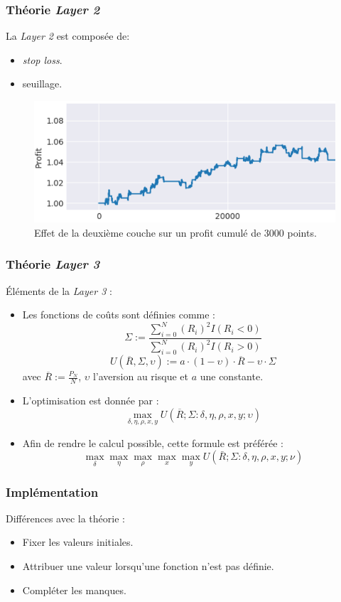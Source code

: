 \documentclass{beamer}
\begin{document}
	\begin{frame}
		\frametitle{Théorie \textit{Layer 2}}
		La \textit{Layer 2} est composée de:
		\begin{itemize}
			\item \textit{stop loss}.
			\item seuillage.
		\end{itemize}
		\begin{figure}
			\includegraphics[scale=0.4]{../Rapport/images/stop_loss}
			\caption{Effet de la deuxième couche sur un profit cumulé de 3000 points.}
		\end{figure}
	\end{frame}

	\begin{frame}
		\frametitle{Théorie \textit{Layer 3}}
		Éléments de la \textit{Layer 3} :
		\begin{itemize}
			\item Les fonctions de coûts sont définies comme : $$\Sigma := \frac{\sum_{i=0}^N (R_i)^2 I(R_i < 0)}{\sum_{i=0}^N (R_i)^2 I(R_i > 0)}$$
			$$ U(\overline{R},\Sigma,\upsilon) := a\cdot(1-\upsilon)\cdot \overline{R} - \upsilon \cdot \Sigma$$ avec $\overline{R} := \frac{P_N}{N}$, $\upsilon$ l'aversion au risque et $a$ une constante.
			\item L'optimisation est donnée par : $$\max_{\delta, \eta, \rho, x, y} U(\overline{R};\Sigma: \delta, \eta, \rho, x, y; \upsilon)$$
			\item Afin de rendre le calcul possible, cette formule est préférée : $$\max\limits_{\delta} \max\limits_{\eta} \max\limits_{\rho} \max\limits_{x} \max\limits_{y} U(\bar{R};\Sigma : \delta, \eta, \rho, x, y; \nu)$$
		\end{itemize}
	\end{frame}

	\begin{frame}
		\frametitle{Implémentation}
		Différences avec la théorie :
		\begin{itemize}
			\item Fixer les valeurs initiales.
			\item Attribuer une valeur lorsqu'une fonction n'est pas définie.
			\item Compléter les manques.
		\end{itemize}
	\end{frame}
\end{document}
